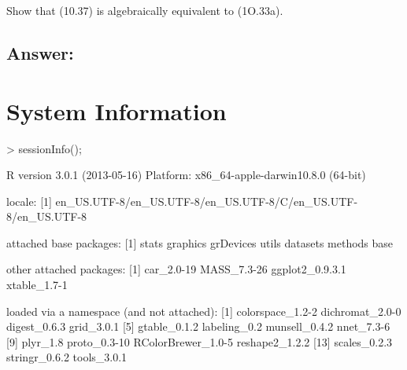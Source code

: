 \documentclass{article}
\begin{document}
Show that (10.37) is algebraically equivalent to (1O.33a).

\subsection{Answer:}

\section{System Information}

\begin{Schunk}
\begin{Sinput}
> sessionInfo();
\end{Sinput}
\begin{Soutput}
R version 3.0.1 (2013-05-16)
Platform: x86_64-apple-darwin10.8.0 (64-bit)

locale:
[1] en_US.UTF-8/en_US.UTF-8/en_US.UTF-8/C/en_US.UTF-8/en_US.UTF-8

attached base packages:
[1] stats     graphics  grDevices utils     datasets  methods   base     

other attached packages:
[1] car_2.0-19      MASS_7.3-26     ggplot2_0.9.3.1 xtable_1.7-1   

loaded via a namespace (and not attached):
 [1] colorspace_1.2-2   dichromat_2.0-0    digest_0.6.3       grid_3.0.1        
 [5] gtable_0.1.2       labeling_0.2       munsell_0.4.2      nnet_7.3-6        
 [9] plyr_1.8           proto_0.3-10       RColorBrewer_1.0-5 reshape2_1.2.2    
[13] scales_0.2.3       stringr_0.6.2      tools_3.0.1       
\end{Soutput}
\end{Schunk}
\end{document}
